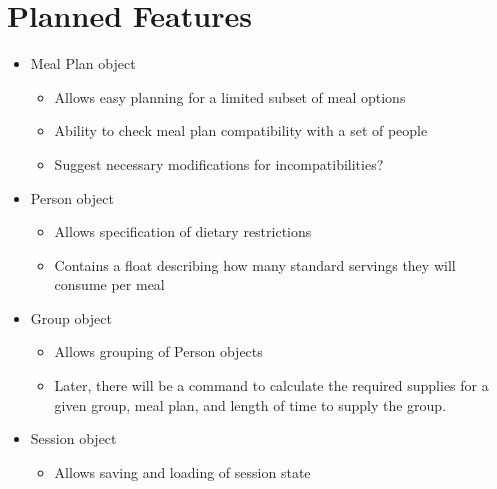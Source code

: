 \documentclass{article}
\begin{document}
\section{Planned Features}
\begin{itemize}
	\item Meal Plan object
	
	\begin{itemize}
		\item Allows easy planning for a limited subset of meal options 
		\item Ability to check meal plan compatibility with a set of people
		\item Suggest necessary modifications for incompatibilities?
	\end{itemize}

	\item Person object 

	\begin{itemize}
		\item Allows specification of dietary restrictions 
		\item Contains a float describing how many standard servings they will consume per meal 
	\end{itemize}

	\item Group object 

	\begin{itemize}
		\item Allows grouping of Person objects 
		\item Later, there will be a command to calculate the required supplies for a given group, meal plan, and length of time 
			to supply the group. 
	\end{itemize}

	\item Session object 
	\begin{itemize}
		\item Allows saving and loading of session state 
	\end{itemize}
\end{itemize}
\end{document}
